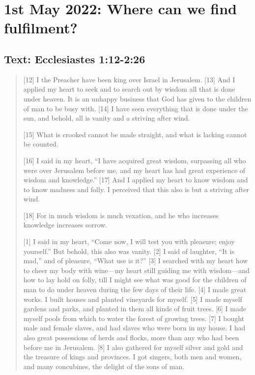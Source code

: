 \section{1st May 2022: Where can we find fulfilment?}
\subsection*{Text: Ecclesiastes 1:12-2:26}
  \begin{quote}
    [12] I the Preacher have been king over Israel in Jerusalem.  [13] And I
    applied my heart to seek and to search out by wisdom all that is done
    under heaven.  It is an unhappy business that God has given to the
    children of man to be busy with.  [14] I have seen everything that is
    done under the sun, and behold, all is vanity and a striving after wind.

    [15] What is crooked cannot be made straight, and what is lacking cannot
    be counted.


    [16] I said in my heart, “I have acquired great wisdom, surpassing all
    who were over Jerusalem before me, and my heart has had great experience
    of wisdom and knowledge.” [17] And I applied my heart to know wisdom and
    to know madness and folly.  I perceived that this also is but a striving
    after wind.

    [18] For in much wisdom is much vexation, and he who increases knowledge
    increases sorrow.


    [1] I said in my heart, “Come now, I will test you with pleasure; enjoy
    yourself.” But behold, this also was vanity.  [2] I said of laughter, “It
    is mad,” and of pleasure, “What use is it?” [3] I searched with my heart
    how to cheer my body with wine—my heart still guiding me with wisdom—and
    how to lay hold on folly, till I might see what was good for the children
    of man to do under heaven during the few days of their life.  [4] I made
    great works.  I built houses and planted vineyards for myself.  [5] I
    made myself gardens and parks, and planted in them all kinds of fruit
    trees.  [6] I made myself pools from which to water the forest of growing
    trees.  [7] I bought male and female slaves, and had slaves who were born
    in my house.  I had also great possessions of herds and flocks, more than
    any who had been before me in Jerusalem.  [8] I also gathered for myself
    silver and gold and the treasure of kings and provinces.  I got singers,
    both men and women, and many concubines, the delight of the sons of man.


\end{quote}
